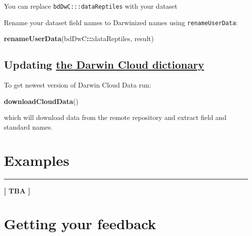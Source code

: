 \documentclass[]{book}
\newenvironment{Shaded}{\begin{snugshade}}{\end{snugshade}}
\newcommand{\KeywordTok}[1]{\textcolor[rgb]{0.13,0.29,0.53}{\textbf{#1}}}
\newcommand{\DataTypeTok}[1]{\textcolor[rgb]{0.13,0.29,0.53}{#1}}
\newcommand{\StringTok}[1]{\textcolor[rgb]{0.31,0.60,0.02}{#1}}
\newcommand{\OperatorTok}[1]{\textcolor[rgb]{0.81,0.36,0.00}{\textbf{#1}}}
\newcommand{\NormalTok}[1]{#1}
\theoremstyle{definition}
\theoremstyle{definition}
\theoremstyle{definition}
\theoremstyle{remark}
\begin{document}
\begin{Shaded}
\end{Shaded}

You can replace \texttt{bdDwC:::dataReptiles} with your dataset

Rename your dataset field names to Darwinized names using
\texttt{renameUserData}:

\begin{Shaded}
\begin{Highlighting}[]
\KeywordTok{renameUserData}\NormalTok{(bdDwC}\OperatorTok{:::}\NormalTok{dataReptiles, result)}
\end{Highlighting}
\end{Shaded}

\section{\texorpdfstring{Updating
\protect\hyperlink{the-darwin-cloud-dictionary}{the Darwin Cloud
dictionary}}{Updating the Darwin Cloud dictionary}}\label{updating-the-darwin-cloud-dictionary-1}

To get newest version of Darwin Cloud Data run:

\begin{Shaded}
\begin{Highlighting}[]
\KeywordTok{downloadCloudData}\NormalTok{()}
\end{Highlighting}
\end{Shaded}

which will download data from the remote repository and extract field
and standard names.

\chapter{Examples}\label{examples}

\begin{center}\rule{0.5\linewidth}{\linethickness}\end{center}

\textbf{{{[} TBA {]}}}

\chapter{Getting your feedback}\label{getting-your-feedback}
\end{document}
